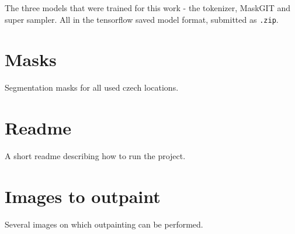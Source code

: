 \documentclass[12pt,a4paper,twoside,openright]{report}
\let\openright=\cleardoublepage
\begin{document}
The three models that were trained for this work - the tokenizer, MaskGIT and super sampler. All in the tensorflow saved model format, submitted as \texttt{.zip}.

\section{Masks} \label{attachment_masks}

Segmentation masks for all used czech locations.

\section{Readme} \label{attachment_readme}

A short readme describing how to run the project.

\section{Images to outpaint} \label{attachment_outpaint_images}

Several images on which outpainting can be performed.

\openright
\end{document}
